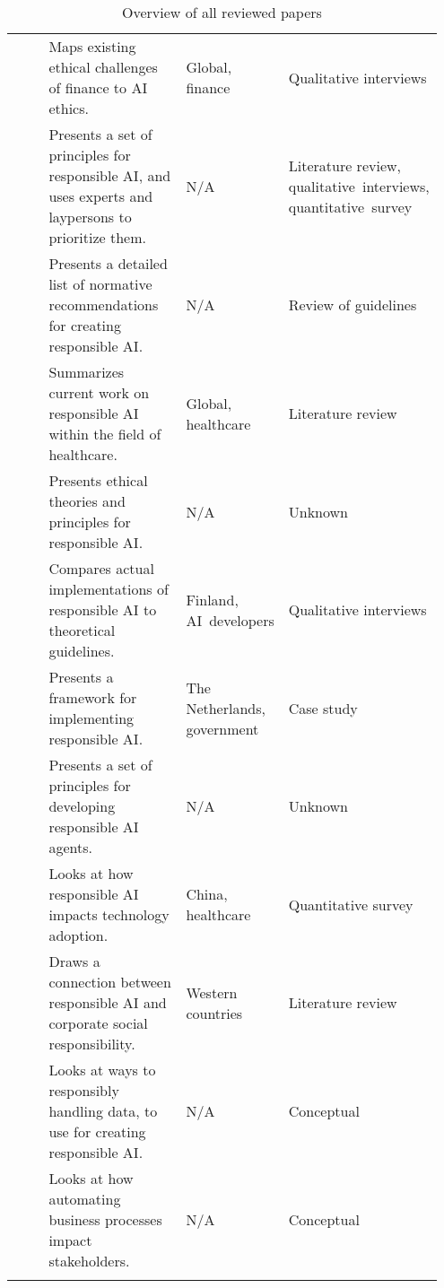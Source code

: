 \begin{landscape}
\begin{ThreePartTable}
\begin{longtable}{P{0.2\linewidth}P{0.4\linewidth}P{0.15\linewidth}P{0.2\linewidth}}
        \textcite{Rizinski_2022} & Maps existing ethical challenges of finance to AI ethics. & Global, finance & Qualitative interviews \\ 
        \textcite{Rothenberger_2019} & Presents a set of principles for responsible AI, and uses experts and laypersons to prioritize them. & N/A\tnote{*} & Literature review, \mbox{qualitative interviews}, \mbox{quantitative survey} \\ 
        \textcite{Ryan_2021} & Presents a detailed list of normative recommendations for creating responsible AI. & N/A\tnote{*} & Review of guidelines \\ 
        \textcite{Siala_2022} & Summarizes current work on responsible AI within the field of healthcare. & Global, healthcare & Literature review \\ 
        \textcite{Thelisson_2018} & Presents ethical theories and principles for responsible AI. & N/A\tnote{*} & Unknown\tnote{\textdagger} \\ 
        \textcite{Vakkuri_2022} & Compares actual implementations of responsible AI to theoretical guidelines. & Finland, \mbox{AI developers} & Qualitative interviews \\ 
        \textcite{vanBruxvoort_2021} & Presents a framework for implementing responsible AI. & The Netherlands, government & Case study \\ 
        \textcite{Vetro_2019} & Presents a set of principles for developing responsible AI agents. & N/A\tnote{*} & Unknown\tnote{\textdagger} \\ 
        \textcite{WangW_2021} & Looks at how responsible AI impacts technology adoption. & China, healthcare & Quantitative survey \\ 
        \textcite{WangY_2020} & Draws a connection between responsible AI and corporate social responsibility. & Western countries & Literature review \\ 
        \textcite{Werder_2022} & Looks at ways to responsibly handling data, to use for creating responsible AI. & N/A\tnote{*} & Conceptual \\ 
        \textcite{Wright_2018} & Looks at how automating business processes impact stakeholders. & N/A\tnote{*} & Conceptual \\ 
    \bottomrule
    \caption{Overview of all reviewed papers}
    \label{tab:paper-overview}
\end{longtable}

\end{ThreePartTable}

\end{landscape}
